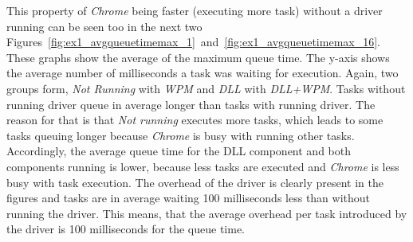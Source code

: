 This property of \emph{Chrome} being faster (executing more task) without a driver running can be seen too in the next two Figures~\ref{fig:ex1_avgqueuetimemax_1}~and~\ref{fig:ex1_avgqueuetimemax_16}. These graphs show the average of the maximum queue time. The y-axis shows the average number of milliseconds a task was waiting for execution. Again, two groups form, \emph{Not Running} with \emph{\gls{WPM}} and \emph{\gls{DLL}} with \emph{\gls{DLL}+\gls{WPM}}. Tasks without running driver queue in average longer than tasks with running driver. The reason for that is that \emph{Not running} executes more tasks, which leads to some tasks queuing longer because \emph{Chrome} is busy with running other tasks. Accordingly, the average queue time for the \gls{DLL} component and both components running is lower, because less tasks are executed and \emph{Chrome} is less busy with task execution. The overhead of the driver is clearly present in the figures and tasks are in average waiting 100 milliseconds less than without running the driver. This means, that the average overhead per task introduced by the driver is 100 milliseconds for the queue time.
